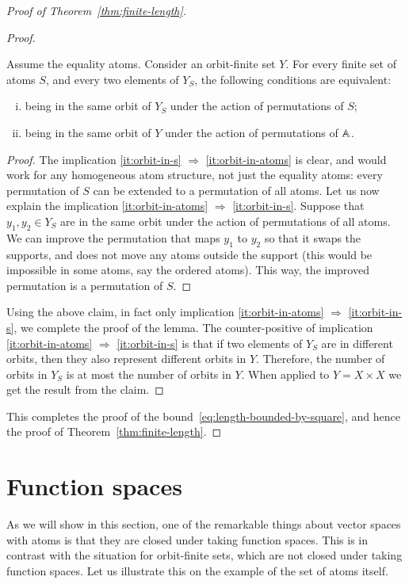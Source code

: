\begin{proof}[Proof of Theorem~\ref{thm:finite-length}]
\begin{proof}
        \begin{claim}
            Assume the equality atoms.
            Consider an orbit-finite set $Y$. For every finite set of atoms $S$, and every  two elements of $Y_S$, the following conditions are equivalent: 
            \begin{enumerate}[(i)]
                \item \label{it:orbit-in-s} being  in the same orbit of $Y_S$ under the action of permutations of $S$;
                \item \label{it:orbit-in-atoms} being in the same orbit of $Y$ under the action of permutations of $\mathbb A$.
            \end{enumerate}
        \end{claim}
    \begin{proof}
    The implication \ref{it:orbit-in-s} $\Rightarrow$ \ref{it:orbit-in-atoms} is clear, and would work for any homogeneous atom structure, not just the equality atoms: every permutation of $S$ can be extended to a permutation of all atoms. Let us now explain the implication \ref{it:orbit-in-atoms} $\Rightarrow$ \ref{it:orbit-in-s}.    Suppose that $y_1, y_2 \in Y_S$ are in the same orbit under the action of permutations of all atoms. We can improve the permutation that maps $y_1$ to $y_2$ so that it  swaps the supports, and does not move any atoms outside the support (this would be impossible in some atoms, say the ordered atoms). This way, the improved permutation is a permutation of $S$. 
    \end{proof}   
    
    Using the above claim, in fact only implication \ref{it:orbit-in-atoms} $\Rightarrow$ \ref{it:orbit-in-s}, we complete the proof of the lemma.
The counter-positive of  implication \ref{it:orbit-in-atoms} $\Rightarrow$ \ref{it:orbit-in-s} is that if two elements of $Y_S$ are in different orbits, then they also represent different orbits in $Y$. Therefore, the number of orbits in $Y_S$ is at most the number of orbits in $Y$. When applied to $Y = X \times X$ we get the result from the claim.
    \end{proof}
This completes the proof of the bound~\eqref{eq:length-bounded-by-square}, and hence the proof of Theorem~\ref{thm:finite-length}.
\end{proof}



\section{Function spaces}
\label{sec:function-spaces}
As we will show in this section, one of the remarkable things about vector spaces with atoms is that they are closed under taking function spaces.  This is in contrast with the situation for orbit-finite sets, which are not closed under taking function spaces. Let us illustrate this on the example of the set of atoms itself.

